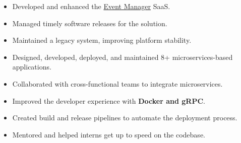 \documentclass[10pt,a4paper,ragged2e]{altacv}
\begin{document}

\personalinfo{%
	
}

\begin{fullwidth}
	\makecvheader
\end{fullwidth}





\begin{itemize}
  \item Developed and enhanced the \href{https://www.brightlysoftware.com/products/event-manager}{Event Manager} SaaS.
  \item Managed timely software releases for the solution.
  \item Maintained a legacy system, improving platform stability.
\end{itemize}

  

\divider



\begin{itemize}
  \item Designed, developed, deployed, and maintained 8+ microservices-based applications.
  \item Collaborated with cross-functional teams to integrate microservices.
  \item Improved the developer experience with \textbf{Docker and gRPC}.
  \item Created build and release pipelines to automate the deployment process.
  \item Mentored and helped interns get up to speed on the codebase.
\end{itemize}
\end{document}
